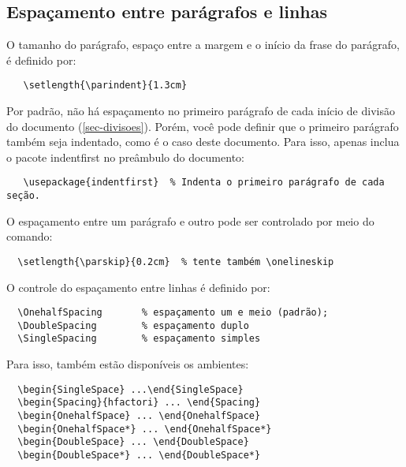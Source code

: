 \documentclass[article,12pt,oneside,a4paper,chapter=TITLE,
			   english,brazil]{abntex2}
\begin{document}
\begin{anexosenv}
\section{Espaçamento entre parágrafos e linhas}

O tamanho do parágrafo, espaço entre a margem e o início da frase do parágrafo, é definido por:
\begin{verbatim}
   \setlength{\parindent}{1.3cm}
\end{verbatim}

Por padrão, não há espaçamento no primeiro parágrafo de cada início de divisão do documento (\autoref{sec-divisoes}). Porém, você pode definir que o primeiro parágrafo também seja indentado, como é o caso deste documento. Para isso, apenas inclua o pacote \textsf{indentfirst} no preâmbulo do documento:
\begin{verbatim}
   \usepackage{indentfirst}  % Indenta o primeiro parágrafo de cada seção.
\end{verbatim}

O espaçamento entre um parágrafo e outro pode ser controlado por meio do comando:
\begin{verbatim}
  \setlength{\parskip}{0.2cm}  % tente também \onelineskip
\end{verbatim}

O controle do espaçamento entre linhas é definido por:
\begin{verbatim}
  \OnehalfSpacing       % espaçamento um e meio (padrão); 
  \DoubleSpacing        % espaçamento duplo
  \SingleSpacing        % espaçamento simples	
\end{verbatim}

Para isso, também estão disponíveis os ambientes:
\begin{verbatim}
  \begin{SingleSpace} ...\end{SingleSpace}
  \begin{Spacing}{hfactori} ... \end{Spacing}
  \begin{OnehalfSpace} ... \end{OnehalfSpace}
  \begin{OnehalfSpace*} ... \end{OnehalfSpace*}
  \begin{DoubleSpace} ... \end{DoubleSpace}
  \begin{DoubleSpace*} ... \end{DoubleSpace*} 
\end{verbatim}


\end{anexosenv}
\end{document}
